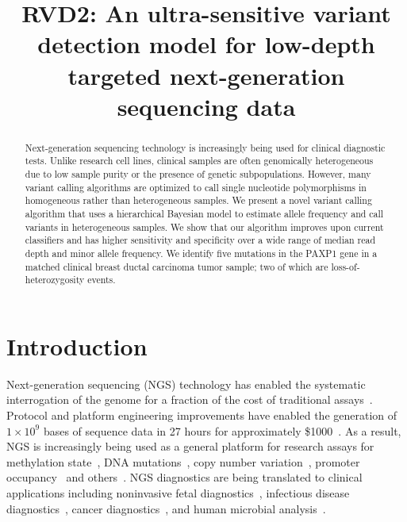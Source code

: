 \documentclass[11pt,reqno]{amsart}
\title[RVD2]{RVD2: An ultra-sensitive variant detection model for low-depth targeted next-generation sequencing data}
\author{}
\begin{document}
\begin{abstract}
Next-generation sequencing technology is increasingly being used for clinical diagnostic tests. Unlike research cell lines, clinical samples are often genomically heterogeneous due to low sample purity or the presence of genetic subpopulations. However, many variant calling algorithms are optimized to call single nucleotide polymorphisms in homogeneous rather than heterogeneous samples. We present a novel variant calling algorithm that uses a hierarchical Bayesian model to estimate allele frequency and call variants in heterogeneous samples. We show that our algorithm improves upon current classifiers and has higher sensitivity and specificity over a wide range of median read depth and minor allele frequency. We identify five mutations in the PAXP1 gene in a matched clinical breast ductal carcinoma tumor sample; two of which are loss-of-heterozygosity events.

\end{abstract}

\maketitle

\section{Introduction}

Next-generation sequencing (NGS) technology has enabled the systematic interrogation of the genome for a fraction of the cost of traditional assays~\citep{Koboldt:2013kw}. Protocol and platform engineering improvements have enabled the generation of $1\times10^9$ bases of sequence data in 27 hours for approximately \$1000~\citep{Quail:2012hf}. As a result, NGS is increasingly being used as a general platform for research assays for methylation state~\citep{Laird:2010ab}, DNA mutations~\citep{Consortium:2013co}, copy number variation~\citep{Alkan:2009cr}, promoter occupancy~\citep{Ouyang:2009hc} and others~\citep{Rivera:2013ee}. NGS diagnostics are being translated to clinical applications including noninvasive fetal diagnostics~\citep{Kitzman:2012hea}, infectious disease diagnostics~\citep{Capobianchi:2012em}, cancer diagnostics~\citep{Navin:2010gu}, and human microbial analysis~\citep{Consortium:2013iz}. 
\end{document}
